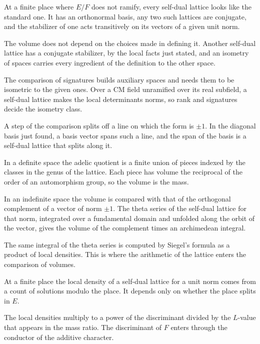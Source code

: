 At a finite place where $E/F$ does not ramify, every self-dual lattice looks like the standard one.
It has an orthonormal basis, any two such lattices are conjugate, and the stabilizer of one acts
transitively on its vectors of a given unit norm.

The volume does not depend on the choices made in defining it. Another self-dual lattice has a
conjugate stabilizer, by the local facts just stated, and an isometry of spaces carries every
ingredient of the definition to the other space.

The comparison of signatures builds auxiliary spaces and needs them to be isometric to the given
ones. Over a CM field unramified over its real subfield, a self-dual lattice makes the local
determinants norms, so rank and signatures decide the isometry class.

A step of the comparison splits off a line on which the form is $\pm1$. In the diagonal basis just
found, a basis vector spans such a line, and the span of the basis is a self-dual lattice that
splits along it.

In a definite space the adelic quotient is a finite union of pieces indexed by the classes in the
genus of the lattice. Each piece has volume the reciprocal of the order of an automorphism group,
so the volume is the mass.

In an indefinite space the volume is compared with that of the orthogonal complement of a vector of
norm $\pm1$. The theta series of the self-dual lattice for that norm, integrated over a
fundamental domain and unfolded along the orbit of the vector, gives the volume of the complement
times an archimedean integral.

The same integral of the theta series is computed by Siegel's formula as a product of local
densities. This is where the arithmetic of the lattice enters the comparison of volumes.

At a finite place the local density of a self-dual lattice for a unit norm comes from a count of
solutions modulo the place. It depends only on whether the place splits in $E$.

The local densities multiply to a power of the discriminant divided by the $L$-value that appears
in the mass ratio. The discriminant of $F$ enters through the conductor of the additive character.

